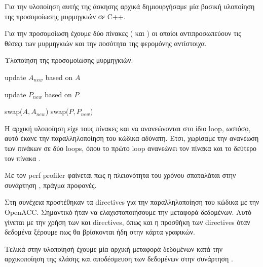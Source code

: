 \documentclass[11pt]{scrartcl} %
\begin{document}
Για την υλοποίηση αυτής της άσκησης αρχικά δημιουργήσαμε μία 
βασική υλοποίηση της προσομοίωσης μυρμηγκιών σε C++.

Για την προσομοίωση έχουμε δύο πίνακες ( και ) οι οποίοι αντιπροσωπεύουν 
τις θέσεςι των μυρμηγκιών και την ποσότητα της φερομόνης αντίστοιχα. 

\begin{algorithm}[H]
\caption{Υλοποίηση της προσομοίωσης μυρμηγκιών.}
\label{alg:serial}
\begin{algorithmic}[1]
    \State update $A_{new}$ based on $A$
\EndFor
\EndFor

    \State update $P_{new}$ based on $P$
\EndFor
\EndFor

    \State swap($A, A_{new}$)
    \State swap($P, P_{new}$)
\EndProcedure
\end{algorithmic}
\end{algorithm}

Η αρχική υλοποίηση είχε τους πίνακες  και  να ανανεώνονται στο ίδιο loop,
ωστόσο, αυτό έκανε την παραλληλοποίηση του κώδικα αδύνατη. Έτσι, 
χωρίσαμε την ανανέωση των πινάκων σε δύο loops, όπου το πρώτο loop ανανεώνει τον πίνακα  και το δεύτερο τον πίνακα .

Με τον perf profiler φαίνεται πως η πλειονότητα του χρόνου σπαταλάται στην συνάρτηση ,
πράγμα προφανές.



Στη συνέχεια προστέθηκαν τα directives για την παραλληλοποίηση του κώδικα με την OpenACC.
Σημαντικό ήταν να ελαχιστοποιήσουμε την μεταφορά δεδομένων. Αυτό γίνεται με την χρήση των  και  directives,
όπως και η προσθήκη των  directives όταν δεδομένα ξέρουμε πως θα βρίσκονται ήδη στην κάρτα γραφικών.

Τελικά στην υλοποίησή έχουμε μία αρχική μεταφορά δεδομένων 
κατά την αρχικοποίηση της κλάσης  και αποδέσμευση των δεδομένων στην συνάρτηση .


\end{document}
